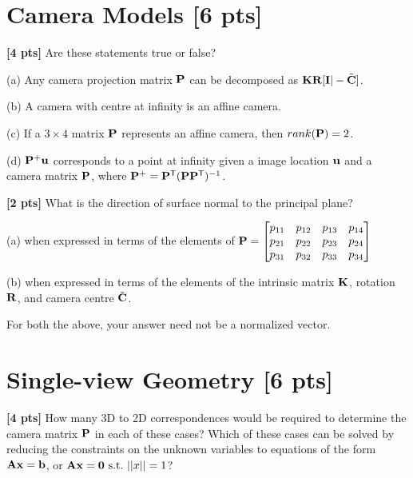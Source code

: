 \documentclass[11pt,addpoints,answers]{exam}
\numberwithin{equation}{section} %
\numberwithin{figure}{section} %
\numberwithin{table}{section} %
\begin{document}
\clearpage

\section{Camera Models  [6 pts]}
\begin{questions}

\question \textbf{[4 pts]} Are these statements true or false?

(a) Any camera projection matrix $\mathbf{P}$ can be decomposed as $\mathbf{K}\mathbf{R}[\mathbf{I} | -\tilde{\mathbf{C}}]$.

(b) A camera with centre at infinity is an affine camera.

(c) If a $3\times 4$ matrix $\mathbf{P}$ represents an affine camera, then $rank(\mathbf{P})=2$.

(d) $\mathbf{P}^{+}\mathbf{u}$ corresponds to a point at infinity given a image location $\mathbf{u}$ and a camera matrix $\mathbf{P}$, where $\mathbf{P}^{+} = \mathbf{P}^{\mathsf{T}}(\mathbf{P}\mathbf{P}^{\mathsf{T}})^{-1}$.

\begin{tcolorbox}[fit,height=5cm, width=\textwidth, blank, borderline={0.5pt}{-2pt},halign=left, valign=center, nobeforeafter]


\end{tcolorbox}

\question \textbf{[2 pts]} What is the direction of surface normal to the principal plane? 

(a) when expressed in terms of the elements of $\mathbf{P} = \begin{bmatrix}
p_{11} & p_{12} & p_{13} & p_{14} \\ 
p_{21} & p_{22} & p_{23} & p_{24} \\ 
p_{31} & p_{32} & p_{33} & p_{34}
\end{bmatrix}$

(b) when expressed in terms of the elements of the intrinsic matrix $\mathbf{K}$, rotation $\mathbf{R}$, and camera centre $\tilde{\mathbf{C}}$.

For both the above, your answer need not be a normalized vector.

\begin{tcolorbox}[fit,height=5cm, width=\textwidth, blank, borderline={0.5pt}{-2pt},halign=left, valign=center, nobeforeafter]


\end{tcolorbox}

\section{Single-view Geometry [6 pts]}
\question \textbf{[4 pts]} How many 3D to 2D correspondences would be required to determine the camera matrix $\mathbf{P}$ in each of these cases? Which of these cases can be solved by reducing the constraints on the unknown variables to equations of the form $\mathbf{A}\mathbf{x}=\mathbf{b}$, or $\mathbf{A}\mathbf{x}=\mathbf{0}~\text{s.t.}~||x||=1$?


\end{questions}
\end{document}

